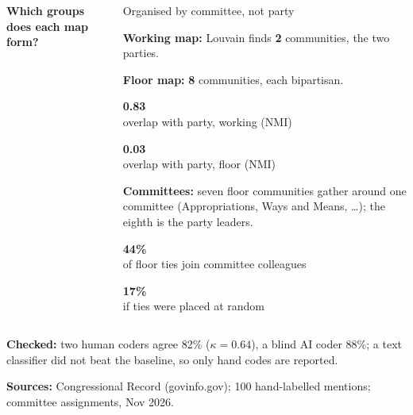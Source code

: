 \documentclass[aspectratio=169,8pt]{beamer}
\newcommand{\foot}[2]{{\tiny\color{mute}\textbf{Checked:} #1\par\textbf{Sources:} #2\par}}
\newcommand{\bigsize}{17}
\newcommand{\coltitle}[1]{\parbox[t][0.40cm][t]{\linewidth}{\small\bfseries #1}}
\newcommand{\bl}[2]{\par\hangindent=7pt\hangafter=1\noindent\makebox[7pt][l]{\textcolor{theme}{\textbullet}}%
  \textbf{#1} #2\par\vspace{1.6pt}}
\newcommand{\tile}[4]{{\setlength{\fboxsep}{0pt}\colorbox{band}{\parbox[c][#2][c]{#1}{\centering
  {\fontsize{\bigsize}{19}\selectfont\bfseries #3}\\[0pt]{\scriptsize #4}}}}}
\begin{document}
\begin{frame}[t]
\begin{columns}[T,totalwidth=\textwidth]
\coltitle{Which groups does each map form?}\\
\begin{bandbox}[height=5.55cm]{Organised by committee, not party}
\bl{Working map:}{Louvain finds \textbf{2} communities, the two parties.}
\bl{Floor map:}{\textbf{8} communities, each bipartisan.}\vspace{3pt}
\tile{0.48\linewidth}{1.0cm}{0.83}{overlap with party, working (NMI)}\hfill
\tile{0.48\linewidth}{1.0cm}{\textcolor{accent}{0.03}}{overlap with party, floor (NMI)}\par\vspace{5pt}
\bl{Committees:}{seven floor communities gather around one committee (Appropriations, Ways and Means, \ldots); the
eighth is the party leaders.}\vspace{3pt}
\tile{0.48\linewidth}{1.0cm}{\textcolor{accent}{44\%}}{of floor ties join committee colleagues}\hfill
\tile{0.48\linewidth}{1.0cm}{17\%}{if ties were placed at random}
\end{bandbox}
\end{columns}
\vfill
\foot{two human coders agree 82\% ($\kappa=0.64$), a blind AI coder 88\%; a text classifier did not beat the
baseline, so only hand codes are reported.}{Congressional Record (govinfo.gov); 100 hand-labelled mentions;
committee assignments, Nov 2026.}
\end{frame}
\end{document}
